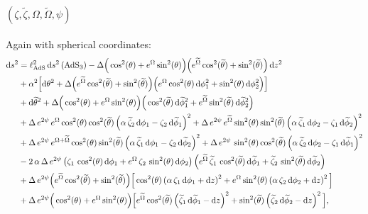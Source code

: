 \documentclass[a4paper, 11pt]{article}
\numberwithin{equation}{section}
\newcommand{\ts}[1]{\widetilde{#1}}
\newcommand{\+}{\oplus}
\renewcommand{\d}{\ensuremath{\mathrm{d}}\xspace}
\begin{document}
\paragraph{\boldmath $(\zeta,\ts{\zeta},\Omega,\ts{\Omega},\psi)$}
Again with spherical coordinates:
\begin{equation}
	\begin{split}
		\d s^{2} &= \ell_{\rm AdS}^{2}\,\d s^{2}\left({\rm AdS}_{3}\right) -\Delta\Big(\cos^{2}(\theta)+e^{\Omega}\sin^{2}(\theta)\Big)\Big(e^{\ts{\Omega}}\cos^{2}(\ts{\theta})+\sin^{2}(\ts{\theta})\Big)\,\d z^{2}\\
		&+ \alpha^{2}\Big[\d\theta^{2} + \Delta\Big(e^{\ts{\Omega}}\cos^{2}(\ts{\theta})+\sin^{2}(\ts{\theta})\Big)\Big(e^{\Omega}\cos^{2}(\theta)\,\d\phi_{1}^{2}+\sin^{2}(\theta)\,\d\phi_{2}^{2}\Big)\Big]\\
		&+\d\ts{\theta}^{2} + \Delta\Big(\cos^{2}(\theta)+e^{\Omega}\sin^{2}(\theta)\Big)\Big(\cos^{2}(\ts{\theta})\,\d\ts{\phi}_{1}^{2}+e^{\ts{\Omega}}\sin^{2}(\ts{\theta})\,\d\ts{\phi}_{2}^{2}\Big)\\
		&+\Delta\,e^{2\psi}\,e^{\Omega}\cos^{2}(\theta)\cos^{2}(\ts{\theta}) \left(\alpha\,\ts{\zeta}_{2}\,\d\phi_{1}-\zeta_{2}\,\d\ts{\phi}_{1}\right)^{2}+\Delta\,e^{2\psi}\,e^{\ts{\Omega}}\sin^{2}(\theta)\sin^{2}(\ts{\theta}) \left(\alpha\,\ts{\zeta}_{1}\,\d\phi_{2}-\zeta_{1}\,\d\ts{\phi}_{2}\right)^{2}\\
		&+\Delta\,e^{2\psi}\,e^{\Omega+\ts{\Omega}}\cos^{2}(\theta)\sin^{2}(\ts{\theta}) \left(\alpha\,\ts{\zeta}_{1}\,\d\phi_{1}-\zeta_{2}\,\d\ts{\phi}_{2}\right)^{2}+\Delta\,e^{2\psi}\,\sin^{2}(\theta)\cos^{2}(\ts{\theta}) \left(\alpha\,\ts{\zeta}_{2}\,\d\phi_{2}-\zeta_{1}\,\d\ts{\phi}_{1}\right)^{2}\\
		&-2\,\alpha\,\Delta\,e^{2\psi}\left(\zeta_{1}\,\cos^{2}(\theta)\,\d\phi_{1}+e^{\Omega}\,\zeta_{2}\,\sin^{2}(\theta)\,\d\phi_{2}\right)\left(e^{\ts{\Omega}}\,\ts{\zeta}_{1}\,\cos^{2}(\ts{\theta})\,\d\ts{\phi}_{1}+\ts{\zeta}_{2}\,\sin^{2}(\ts{\theta})\,\d\ts{\phi}_{2}\right)\\
		&+\Delta\,e^{2\psi}\Big(e^{\ts{\Omega}}\cos^{2}(\ts{\theta})+\sin^{2}(\ts{\theta})\Big)\Big[\cos^{2}(\theta)\left(\alpha\,\zeta_{1}\,\d\phi_{1}+\d z\right)^{2}+e^{\Omega}\sin^{2}(\theta)\left(\alpha\,\zeta_{2}\,\d\phi_{2}+\d z\right)^{2}\Big]\\
		&+\Delta\,e^{2\psi}\Big(\cos^{2}(\theta)+e^{\Omega}\sin^{2}(\theta)\Big)\Big[e^{\ts{\Omega}}\cos^{2}(\ts{\theta})\left(\ts{\zeta}_{1}\,\d\ts{\phi}_{1}-\d z\right)^{2}+\sin^{2}(\ts{\theta})\left(\ts{\zeta}_{2}\,\d\ts{\phi}_{2}-\d z\right)^{2}\Big],
	\end{split}
\end{equation}
\end{document}
